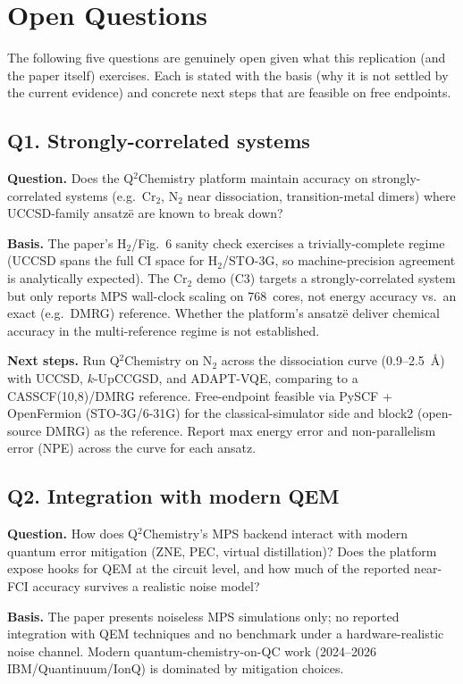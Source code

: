 \section{Open Questions}
The following five questions are genuinely open given what this
replication (and the paper itself) exercises. Each is stated
with the basis (why it is not settled by the current evidence)
and concrete next steps that are feasible on free endpoints.

\subsection*{Q1. Strongly-correlated systems}
\textbf{Question.} Does the Q$^2$Chemistry platform maintain
accuracy on strongly-correlated systems (e.g.\ Cr$_2$, N$_2$ near
dissociation, transition-metal dimers) where UCCSD-family
ansatz\"e are known to break down?

\textbf{Basis.} The paper's H$_2$/Fig.~6 sanity check exercises a
trivially-complete regime (UCCSD spans the full CI space for
H$_2$/STO-3G, so machine-precision agreement is analytically
expected). The Cr$_2$ demo (C3) targets a strongly-correlated
system but only reports MPS wall-clock scaling on 768~cores, not
energy accuracy vs.\ an exact (e.g.\ DMRG) reference. Whether the
platform's ansatz\"e deliver chemical accuracy in the
multi-reference regime is not established.

\textbf{Next steps.} Run Q$^2$Chemistry on N$_2$ across the
dissociation curve (0.9--2.5~\AA) with UCCSD, $k$-UpCCGSD, and
ADAPT-VQE, comparing to a CASSCF(10,8)/DMRG reference. Free-endpoint
feasible via PySCF + OpenFermion (STO-3G/6-31G) for the
classical-simulator side and block2 (open-source DMRG) as the
reference. Report max energy error and non-parallelism error
(NPE) across the curve for each ansatz.

\subsection*{Q2. Integration with modern QEM}
\textbf{Question.} How does Q$^2$Chemistry's MPS backend interact
with modern quantum error mitigation (ZNE, PEC, virtual
distillation)? Does the platform expose hooks for QEM at the
circuit level, and how much of the reported near-FCI accuracy
survives a realistic noise model?

\textbf{Basis.} The paper presents noiseless MPS simulations
only; no reported integration with QEM techniques and no
benchmark under a hardware-realistic noise channel. Modern
quantum-chemistry-on-QC work (2024--2026 IBM/Quantinuum/IonQ) is
dominated by mitigation choices.

